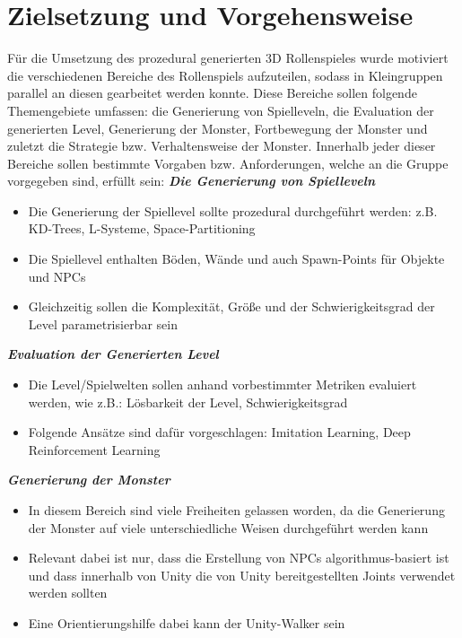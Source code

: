 \section{Zielsetzung und Vorgehensweise}

Für die Umsetzung des prozedural generierten 3D Rollenspieles wurde motiviert die verschiedenen Bereiche des Rollenspiels aufzuteilen, sodass in Kleingruppen parallel an diesen gearbeitet werden konnte. Diese Bereiche sollen folgende Themengebiete umfassen: die Generierung von Spielleveln, die Evaluation der generierten Level, Generierung der Monster, Fortbewegung der Monster und zuletzt die Strategie bzw. Verhaltensweise der Monster. Innerhalb jeder dieser Bereiche sollen bestimmte Vorgaben bzw. Anforderungen, welche an die Gruppe vorgegeben sind, erfüllt sein: \newline \newline
\textbf{\textit{Die Generierung von Spielleveln}}\newline
\begin{itemize}
	\item Die Generierung der Spiellevel sollte prozedural durchgeführt werden: z.B. KD-Trees, L-Systeme, Space-Partitioning
	\item Die Spiellevel enthalten Böden, Wände und auch Spawn-Points für Objekte und NPCs
	\item Gleichzeitig sollen die Komplexität, Größe und der Schwierigkeitsgrad der Level parametrisierbar sein
\end{itemize}
\textbf{\textit{Evaluation der Generierten Level}}
\begin{itemize}
	\item Die Level/Spielwelten sollen anhand vorbestimmter Metriken evaluiert werden, wie z.B.: Lösbarkeit der Level, Schwierigkeitsgrad
	\item Folgende Ansätze sind dafür vorgeschlagen: Imitation Learning, Deep Reinforcement Learning
\end{itemize}
\textbf{\textit{Generierung der Monster}}
\begin{itemize}
	\item In diesem Bereich sind viele Freiheiten gelassen worden, da die Generierung der Monster auf viele unterschiedliche Weisen durchgeführt werden kann
	\item Relevant dabei ist nur, dass die Erstellung von NPCs algorithmus-basiert ist und dass innerhalb von Unity die von Unity bereitgestellten Joints verwendet werden sollten
	\item Eine Orientierungshilfe dabei kann der Unity-Walker sein
\end{itemize}
